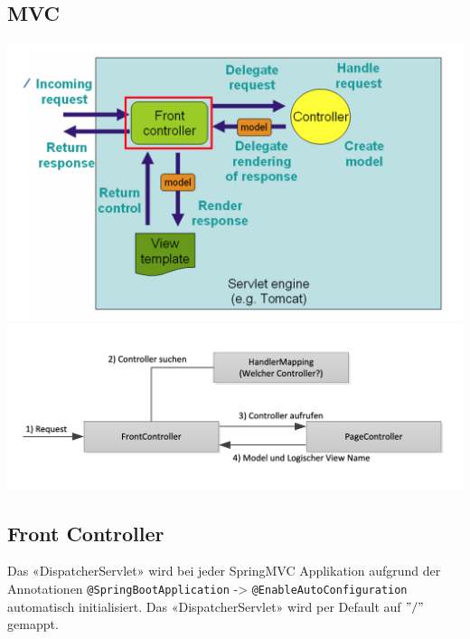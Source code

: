 \subsection{MVC}
\includegraphics[width=\columnwidth]{images/mvcworkflow}
\includegraphics[width=\columnwidth]{images/algofrontpage}
\subsection{Front Controller}
Das «DispatcherServlet» wird bei jeder SpringMVC Applikation aufgrund der Annotationen \texttt{@SpringBootApplication} -> \texttt{@EnableAutoConfiguration} automatisch initialisiert. Das $«$DispatcherServlet$»$ wird per Default auf $"/"$ gemappt.


